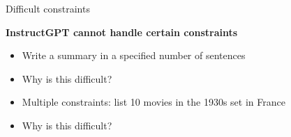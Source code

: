 \begin{vbframe}{Difficult constraints}

\vfill

\textbf{InstructGPT cannot handle certain constraints}

	\begin{itemize}
		\item Write a summary in a specified number
		of sentences
                \item \ques Why is this difficult?
                \item Multiple constraints: list 10 movies
		in the 1930s set in France
                \item \ques Why is this difficult?
	\end{itemize}

\vfill

\end{vbframe}

